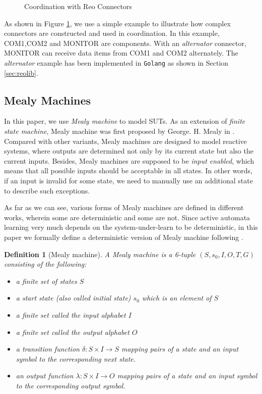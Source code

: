 \documentclass[conference, a4paper]{IEEEtran}
\newtheorem{definition}{Definition}
\begin{document}
\begin{figure}[h]
  \begin{center}
    
  \end{center}
  \caption{Coordination with Reo Connectors}
  \label{fig:reoconnector}
\end{figure}

As shown in Figure \ref{fig:reoconnector}, we use a simple example to illustrate how complex
connectors are constructed and used in coordination. In this example, COM1,COM2 and
MONITOR are components. With an \emph{alternator} connector, MONITOR can receive data items from
COM1 and COM2 alternately. The \emph{alternator} example has been implemented in \texttt{Golang} as
shown in Section \ref{sec:reolib}.


\subsection{Mealy Machines}

In this paper, we use \emph{Mealy machine} to model SUTs.
As an extension of \emph{finite state machine}, Mealy machine was first proposed by George. H. Mealy
in \cite{George1955A}. Compared with other variants, Mealy machines are designed to model
reactive systems, where outputs are determined not only by its current state but also the current
inputs. Besides, Mealy machines are supposed to be \emph{input enabled}, which means that all
possible inputs should be acceptable in all states. In other words, if an input is invalid for some
state, we need to manually use an additional state to describe such exceptions.

As far as we can see, various forms of Mealy machines are defined in different works, wherein some
are deterministic and some are not. Since active automata learning very much depends on the
system-under-learn to be deterministic, in this paper we formally define a deterministic version of
Mealy machine following \cite{DBLP:conf/sfm/SteffenHM11}.

\begin{definition}[Mealy machine]
  A Mealy machine is a 6-tuple $(S, s_0, I, O, T, G)$ consisting of the following:
  \begin{itemize}
    \item[-] a finite set of states $S$
    \item[-] a start state (also called initial state) $s_0$ which is an element of $S$
    \item[-] a finite set called the input alphabet $I$
    \item[-] a finite set called the output alphabet $O$
    \item[-] a transition function $\delta : S \times I \rightarrow S$ mapping pairs of a
      state and an input symbol to the corresponding next state.
    \item[-] an output function $\lambda : S \times I \rightarrow O$ mapping pairs
      of a state and an input symbol to the corresponding output symbol.
  \end{itemize}
\end{definition}
\end{document}
